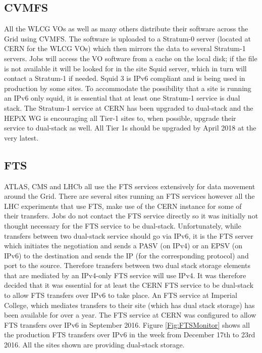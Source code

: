 \documentclass[a4paper]{jpconf}
\begin{document}
\subsection{CVMFS}
All the WLCG VOs as well as many others distribute their software
across the Grid using CVMFS\cite{Stratum1}. The software is uploaded to a Stratum-0
server (located at CERN for the WLCG VOs) which then mirrors the data
to several Stratum-1 servers.  Jobs will access the VO
software from a cache on the local disk; if the file is not available
it will be looked for in the site Squid server, which in turn will
contact a Stratum-1 if needed. Squid 3 is IPv6 compliant and is
being used in production by some sites.  To accommodate the possibility that a site is running an IPv6 only squid, it is essential that at least one Stratum-1 service is dual stack.  The Stratum-1 service at CERN has been upgraded to dual-stack and the HEPiX WG is encouraging all Tier-1 sites to, when possible, upgrade their service to dual-stack as well. All Tier 1s should be upgraded by April 2018 at the very latest.

\subsection{FTS}
ATLAS, CMS and LHCb all use the FTS services extensively for data
movement around the Grid. There are several sites running an FTS services however all the LHC experiments that use FTS, make use of the CERN instance for some of their transfers.  Jobs do not contact the FTS service directly
so it was initially not thought necessary for the FTS service to be dual-stack.  Unfortunately, while transfers between 
two dual-stack service should go via IPv6, it is the FTS
server which initiates the negotiation and sends a PASV (on IPv4) or
an EPSV (on IPv6) to the destination and sends the IP (for the
corresponding protocol) and port to the source.  Therefore transfers between two dual stack storage elements that are mediated by an IPv4-only FTS service will use IPv4.  It was therefore decided that it was essential for at least the CERN FTS service to be dual-stack to allow FTS transfers over IPv6 to take place.  An FTS service at Imperial College, which mediates transfers to their site (which has dual stack storage) has been available for over a year.  The FTS service at CERN was configured to allow FTS transfers over IPv6 in September 2016. Figure \ref{Fig:FTSMonitor} shows all the production FTS transfers over IPv6 in the week from December 17th to 23rd 2016.  All the sites shown are providing dual-stack storage.
\end{document}
